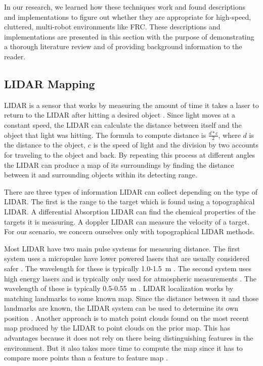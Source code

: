 \documentclass{article}
\begin{document}
  In our research, we learned how these techniques work and found descriptions and implementations to figure out whether they are appropriate for high-speed, cluttered, multi-robot environments like FRC. These descriptions and implementations are presented in this section with the purpose of demonstrating a thorough literature review and of providing background information to the reader.

  \subsection{LIDAR Mapping}
    LIDAR is a sensor that works by measuring the amount of time it takes a laser to return to the LIDAR after hitting a desired object \cite{keith_lidar_2007}. Since light moves at a constant speed, the LIDAR can calculate the distance between itself and the object that light was hitting. The formula to compute distance is $\frac{d*c}{2}$, where $d$ is the distance to the object, $c$ is the speed of light and the division by two accounts for traveling to the object and back. By repeating this process at different angles the LIDAR can produce a map of its surroundings by finding the distance between it and surrounding objects within its detecting range.

    There are three types of information LIDAR can collect depending on the type of LIDAR. The first is the range to the target which is found using a topographical LIDAR. A differential Absorption LIDAR can find the chemical properties of the targets it is measuring. A doppler LIDAR can measure the velocity of a target. For our scenario, we concern ourselves only with topographical LIDAR methods.

    Most LIDAR have two main pulse systems for measuring distance. The first system uses a micropulse have lower powered lasers that are usually considered safer \cite{keith_lidar_2007}. The wavelength for these is typically 1.0-\SI{1.5}{\meter} \cite{lidar_uk_how_2017}. The second system uses high energy lasers and is typically only used for atmospheric measurements \cite{keith_lidar_2007}. The wavelength of these is typically 0.5-\SI{0.55}{\meter} \cite{lidar_uk_how_2017}.
    LIDAR localization works by matching landmarks to some known map. Since the distance between it and those landmarks are known, the LIDAR system can be used to determine its own position \cite{schlichting_vehicle_2016}. Another approach is to match point clouds found on the most recent map produced by the LIDAR to point clouds on the prior map. This has advantages because it does not rely on there being distinguishing features in the environment. But it also takes more time to compute the map since it has to compare more points than a feature to feature map \cite{li_extracting_2010}.
\end{document}
